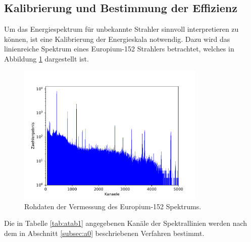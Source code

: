 \subsection{Kalibrierung und Bestimmung der Effizienz}
\label{subsec:a1}
Um das Energiespektrum für unbekannte Strahler sinnvoll interpretieren zu können,
ist eine Kalibrierung der Energieskala notwendig. Dazu wird das linienreiche Spektrum eines Europium-152 Strahlers betrachtet, welches in Abbildung \ref{fig:spektrum_eu} dargestellt ist.
\begin{figure}
 \centering
 \includegraphics[width=0.8\textwidth]{python/plots/spec1.pdf}
 \caption{Rohdaten der Vermessung des Europium-152 Spektrums.}
 \label{fig:spektrum_eu}
 \end{figure}
Die in Tabelle \ref{tab:atab1} angegebenen Kanäle der Spektrallinien werden nach dem in Abschnitt \ref{subsec:a0} beschriebenen Verfahren bestimmt.
